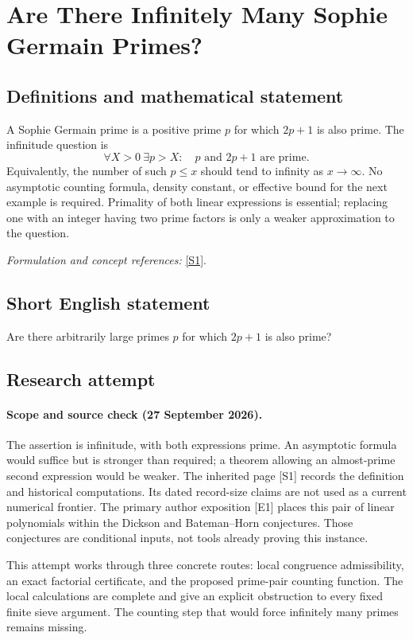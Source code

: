\documentclass[11pt]{article}
\begin{document}
\section*{\texorpdfstring{Are There Infinitely Many Sophie Germain Primes?}{Are There Infinitely Many Sophie Germain Primes?}}\label{1137}
\subsection{Definitions and mathematical statement}
A Sophie Germain prime is a positive prime $p$ for which $2p+1$ is also prime. The infinitude question is
\[
 \forall X>0\ \exists p>X:\quad p\text{ and }2p+1\text{ are prime}.
\]
Equivalently, the number of such $p\le x$ should tend to infinity as $x\to\infty$. No asymptotic counting formula, density constant, or effective bound for the next example is required. Primality of both linear expressions is essential; replacing one with an integer having two prime factors is only a weaker approximation to the question.
\par\smallskip\textit{Formulation and concept references:} \href{https://mathworld.wolfram.com/SophieGermainPrime.html}{[S1]}.

\subsection{Short English statement}
Are there arbitrarily large primes $p$ for which $2p+1$ is also prime?
\subsection{Research attempt}
\paragraph{Scope and source check (27 September 2026).}
The assertion is infinitude, with both expressions prime. An asymptotic formula would suffice but is stronger than required; a theorem allowing an almost-prime second expression would be weaker. The inherited page [S1] records the definition and historical computations. Its dated record-size claims are not used as a current numerical frontier. The primary author exposition [E1] places this pair of linear polynomials within the Dickson and Bateman--Horn conjectures. Those conjectures are conditional inputs, not tools already proving this instance.

This attempt works through three concrete routes: local congruence admissibility, an exact factorial certificate, and the proposed prime-pair counting function. The local calculations are complete and give an explicit obstruction to every fixed finite sieve argument. The counting step that would force infinitely many primes remains missing.
\end{document}
